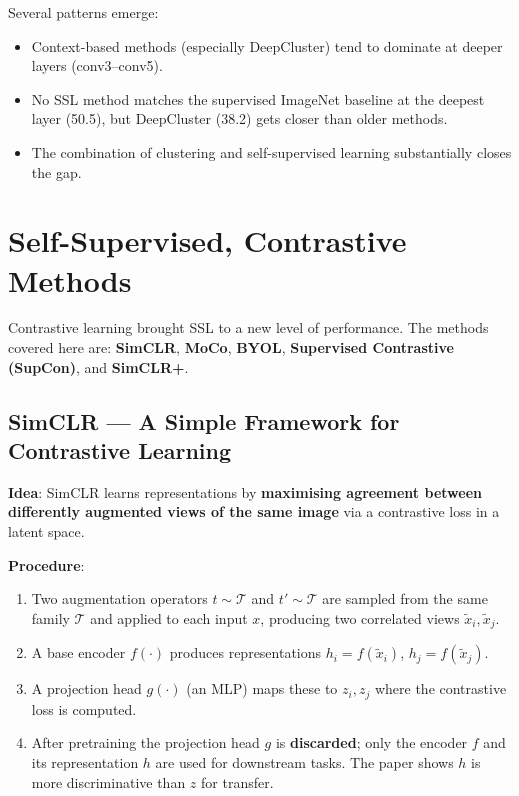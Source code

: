 \documentclass[11pt,a4paper]{article}
\theoremstyle{definition}
\theoremstyle{plain}
\theoremstyle{remark}
\begin{document}
Several patterns emerge:
\begin{itemize}
    \item Context-based methods (especially DeepCluster) tend to dominate at deeper layers (conv3--conv5).
    \item No SSL method matches the supervised ImageNet baseline at the deepest layer (50.5), but DeepCluster (38.2) gets closer than older methods.
    \item The combination of clustering and self-supervised learning substantially closes the gap.
\end{itemize}


\section{Self-Supervised, Contrastive Methods}

Contrastive learning brought SSL to a new level of performance. The methods covered here are: \textbf{SimCLR}, \textbf{MoCo}, \textbf{BYOL}, \textbf{Supervised Contrastive (SupCon)}, and \textbf{SimCLR+}.

\subsection{SimCLR --- A Simple Framework for Contrastive Learning}

\textbf{Idea}: SimCLR learns representations by \textbf{maximising agreement between differently augmented views of the same image} via a contrastive loss in a latent space.

\textbf{Procedure}:
\begin{enumerate}
    \item Two augmentation operators $t \sim \mathcal{T}$ and $t' \sim \mathcal{T}$ are sampled from the same family $\mathcal{T}$ and applied to each input $x$, producing two correlated views $\tilde x_i, \tilde x_j$.
    \item A base encoder $f(\cdot)$ produces representations $h_i = f(\tilde x_i)$, $h_j = f(\tilde x_j)$.
    \item A projection head $g(\cdot)$ (an MLP) maps these to $z_i, z_j$ where the contrastive loss is computed.
    \item After pretraining the projection head $g$ is \textbf{discarded}; only the encoder $f$ and its representation $h$ are used for downstream tasks. The paper shows $h$ is more discriminative than $z$ for transfer.
\end{enumerate}
\end{document}
